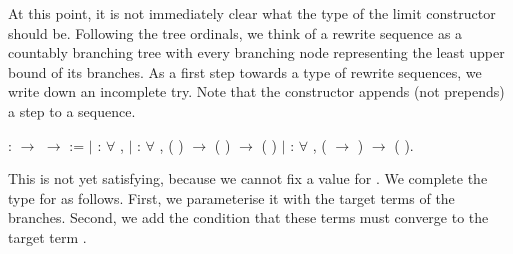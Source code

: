 At this point, it is not immediately clear what the type of the limit
constructor should be. Following the tree ordinals, we think of a rewrite
sequence as a countably branching tree with every branching node representing
the least upper bound of its branches. As a first step towards a type of
rewrite sequences, we write down an incomplete try. Note that the
 constructor appends
(not prepends) a step to a sequence.
\begin{singlespace}
\begin{coqdoccode}
\coqdocnoindent
{}
 :
 \ensuremath{\rightarrow}
 \ensuremath{\rightarrow}
 :=\coqdoceol
\coqdocindent{1.00em}
\ensuremath{|}  :
\ensuremath{\forall} , 
\coqdoceol \coqdocindent{1.00em}
\ensuremath{|} :
\ensuremath{\forall}   , (
 )
$\rightarrow$
( 
) $\rightarrow$ (
)\coqdoceol \coqdocindent{1.00em}
\ensuremath{|}    :
\ensuremath{\forall}  ,
(
\ensuremath{\rightarrow} 
) $\rightarrow$
(
).\coqdoceol
\end{coqdoccode}
\end{singlespace}
This is not yet satisfying, because we cannot fix a value for
. We complete the type for
 as follows. First, we
parameterise it with the target terms of the branches. Second, we add the
condition that these terms must converge to the target term
.
